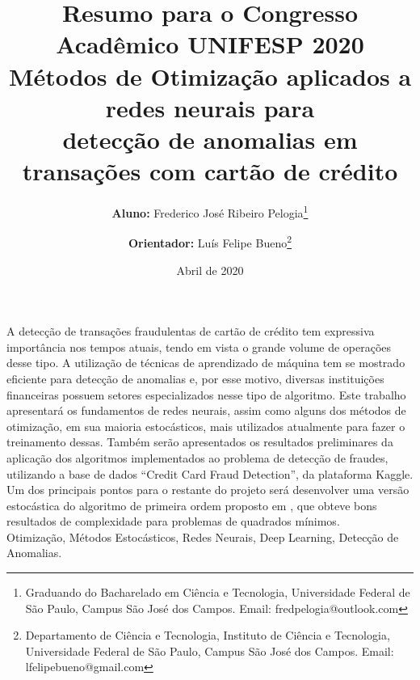 \documentclass[a4paper,12pt]{article}
\title{\large\textbf{Resumo para o Congresso Acadêmico UNIFESP 2020} \\
Métodos de Otimização aplicados a redes neurais para \\ detecção de anomalias em transações com cartão de crédito}
\author{\large\textbf{Aluno:} Frederico José Ribeiro Pelogia\thanks{Graduando do Bacharelado em Ciência e Tecnologia,  Universidade Federal de São Paulo,
Campus  São José dos Campos. Email: fredpelogia@outlook.com}
\and  
\textbf{Orientador:} Luís Felipe Bueno\thanks{Departamento de Ciência e Tecnologia, Instituto de Ciência e Tecnologia,  Universidade Federal de
 São Paulo, Campus  São José dos Campos. Email: lfelipebueno@gmail.com}}
\date{Abril de 2020}
\begin{document}
	

	
\maketitle

\abstract A detecção de transações fraudulentas de cartão de crédito tem expressiva importância nos tempos atuais, tendo em vista o grande volume de operações desse tipo. A utilização de técnicas de aprendizado de máquina tem se mostrado eficiente para detecção de anomalias\cite{Chandola:2009} e, por esse motivo, diversas instituições financeiras possuem setores especializados nesse tipo de algoritmo.
Este trabalho apresentará os fundamentos de redes neurais, assim como alguns dos métodos de otimização, em sua maioria estocásticos,  mais utilizados atualmente para fazer o treinamento dessas. Também serão apresentados os resultados preliminares da aplicação dos algoritmos implementados ao problema de detecção de fraudes, utilizando a base de dados “Credit Card Fraud Detection”, da plataforma Kaggle. Um dos principais pontos para o restante do projeto será desenvolver uma versão estocástica do algoritmo de primeira ordem proposto em \cite{bmLS}, que obteve bons resultados de complexidade para problemas de quadrados mínimos.\\



 {Otimização, Métodos Estocásticos, Redes Neurais, Deep Learning, Detecção de Anomalias.}


%
% 
% 
\printbibliography
\end{document}
